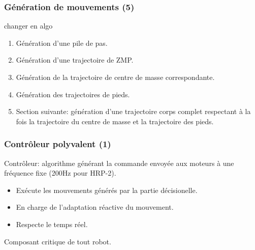 \documentclass[14pt,utf8x,hyperref={pdfpagelabels=false}]{beamer}
\begin{document}
\begin{slideDecision}
  \frametitle{Génération de mouvements (5)}
  \begin{changeleftmargin}{1.1cm}
  \begin{center}
    changer en algo
    \begin{enumerate}
    \item Génération d'une pile de pas.
    \item Génération d'une trajectoire de ZMP.
    \item Génération de la trajectoire de centre de masse
      correspondante.
    \item Génération des trajectoires de pieds.
    \item Section suivante: génération d'une trajectoire corps complet
      respectant à la fois la trajectoire du centre de masse et la
      trajectoire des pieds.
    \end{enumerate}
  \end{center}
  \end{changeleftmargin}
\end{slideDecision}


\begin{slideAction}
  \frametitle{Contrôleur polyvalent (1)}

  \begin{changeleftmargin}{1.1cm}
  \begin{center}
    Contrôleur: algorithme générant la commande envoyée aux moteurs à
    une fréquence fixe (200Hz pour HRP-2).

    \bigskip

    \begin{itemize}
    \item Exécute les mouvements générés par la partie décisionelle.
    \item En charge de l'adaptation réactive du mouvement.
    \item Respecte le temps réel.
    \end{itemize}

    \bigskip

    Composant \alert{critique} de tout robot.
  \end{center}
  \end{changeleftmargin}
\end{slideAction}
\end{document}
